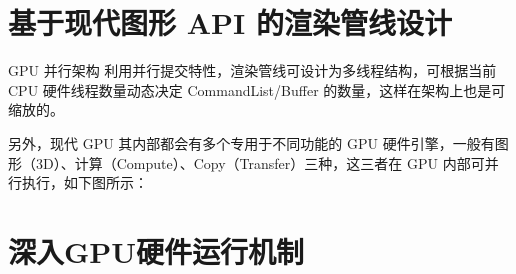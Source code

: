 \documentclass[UTF8]{ctexart}
\begin{document}
\section{基于现代图形 API 的渲染管线设计}
GPU 并行架构
利用并行提交特性，渲染管线可设计为多线程结构，可根据当前 CPU 硬件线程数量动态决定 CommandList/Buffer 的数量，这样在架构上也是可缩放的。

另外，现代 GPU 其内部都会有多个专用于不同功能的 GPU 硬件引擎，一般有图形（3D）、计算（Compute）、Copy（Transfer）三种，这三者在 GPU 内部可并行执行，如下图所示：


\section{深入GPU硬件运行机制}
\end{document}
